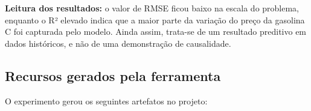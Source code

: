 \documentclass[11pt, a4paper, oneside]{article}
\begin{document}
\begin{infobox}
\textbf{Leitura dos resultados:} o valor de RMSE ficou baixo na escala do problema,
enquanto o R² elevado indica que a maior parte da variação do preço da gasolina C foi
capturada pelo modelo. Ainda assim, trata-se de um resultado preditivo em dados
históricos, e não de uma demonstração de causalidade.
\end{infobox}

\subsection{Recursos gerados pela ferramenta}
\label{sec:flaml-recursos}

O experimento gerou os seguintes artefatos no projeto:
\end{document}
